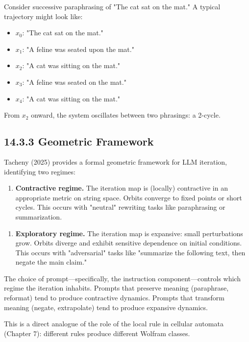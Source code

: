\begin{example}
Consider successive paraphrasing of "The cat sat on the mat." A typical trajectory might look like:
\end{example}

\begin{itemize}
  \item $x_0$: "The cat sat on the mat."
  \item $x_1$: "A feline was seated upon the mat."
  \item $x_2$: "A cat was sitting on the mat."
  \item $x_3$: "A feline was seated on the mat."
  \item $x_4$: "A cat was sitting on the mat."
\end{itemize}

From $x_2$ onward, the system oscillates between two phrasings: a 2-cycle.

\subsection{14.3.3 Geometric Framework}

Tacheny (2025) provides a formal geometric framework for LLM iteration, identifying two regimes:

\begin{enumerate}
  \item \textbf{Contractive regime.} The iteration map is (locally) contractive in an appropriate metric on string space. Orbits converge to fixed points or short cycles. This occurs with "neutral" rewriting tasks like paraphrasing or summarization.
\end{enumerate}

\begin{enumerate}
  \item \textbf{Exploratory regime.} The iteration map is expansive: small perturbations grow. Orbits diverge and exhibit sensitive dependence on initial conditions. This occurs with "adversarial" tasks like "summarize the following text, then negate the main claim."
\end{enumerate}

\begin{proposition}[Informal]
The choice of prompt---specifically, the instruction component---controls which regime the iteration inhabits. Prompts that preserve meaning (paraphrase, reformat) tend to produce contractive dynamics. Prompts that transform meaning (negate, extrapolate) tend to produce expansive dynamics.

This is a direct analogue of the role of the local rule in cellular automata (Chapter 7): different rules produce different Wolfram classes.
\end{proposition}

